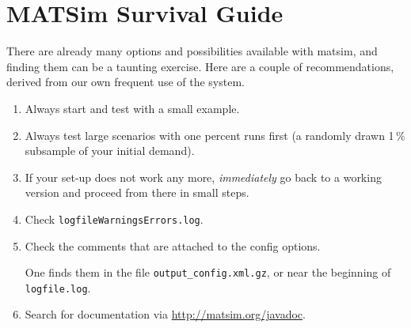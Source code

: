 \section{MATSim Survival Guide}
\label{sec:survival}



There are already many options and possibilities available with \gls{matsim}, and finding them can be a taunting exercise.  Here are a couple of recommendations, derived from our own frequent use of the system.
\begin{enumerate}

\item Always start and test with a small example.

\item Always test large scenarios with one percent runs first (\eg a randomly drawn 1\,\% subsample of your initial demand). 

\item If your set-up does not work any more, \emph{immediately} go back to a working version and proceed from there in small steps.

\item Check \lstinline{logfileWarningsErrors.log}.

\item Check the comments that are attached to the config options.

One finds them in the file \lstinline{output_config.xml.gz}, or near the beginning of \lstinline{logfile.log}.

\item Search for documentation via \url{http://matsim.org/javadoc}.

\end{enumerate}




